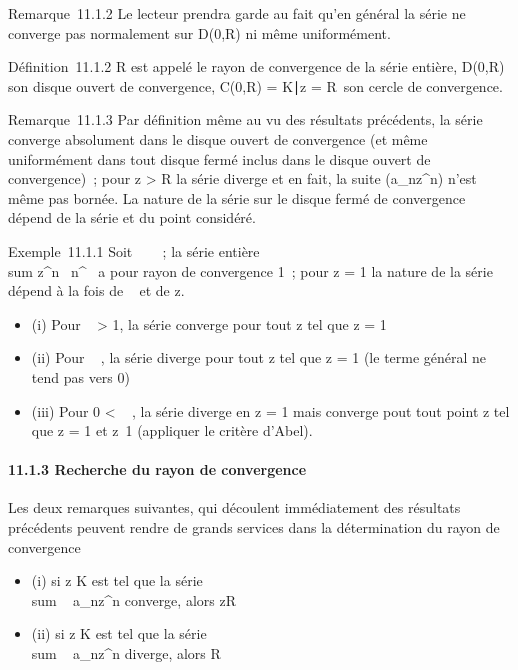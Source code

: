 \documentclass[]{article}
\begin{document}
Remarque~11.1.2 Le lecteur prendra garde au fait qu'en général la série
ne converge pas normalement sur D(0,R) ni même uniformément.

Définition~11.1.2 R est appelé le rayon de convergence de la série
entière, D(0,R) son disque ouvert de convergence, C(0,R) =
\z \in K∣z
= R\ son cercle de convergence.

Remarque~11.1.3 Par définition même au vu des résultats précédents, la
série converge absolument dans le disque ouvert de convergence (et même
uniformément dans tout disque fermé inclus dans le disque ouvert de
convergence)~; pour z \textgreater{} R la série
diverge et en fait, la suite (a_nz^n) n'est même pas
bornée. La nature de la série sur le disque fermé de convergence dépend
de la série et du point considéré.

Exemple~11.1.1 Soit \alpha~ \in {}~~; la série entière
\\sum   z^n~
\over n^\alpha~ a pour rayon de convergence 1~;
pour z = 1 la nature de la série dépend à la fois de
\alpha~ et de z.

\begin{itemize}
\itemsep1pt\parskip0pt
\item
  (i) Pour \alpha~ \textgreater{} 1, la série converge pour tout z tel que
  z = 1
\item
  (ii) Pour \alpha~ , la série diverge pour tout z tel que
  z = 1 (le terme général ne tend pas vers 0)
\item
  (iii) Pour 0 \textless{} \alpha~ , la série diverge en z = 1 mais
  converge pout tout point z tel que z = 1 et
  z\neq~1 (appliquer le critère d'Abel).
\end{itemize}

\paragraph{11.1.3 Recherche du rayon de convergence}

Les deux remarques suivantes, qui découlent immédiatement des résultats
précédents peuvent rendre de grands services dans la détermination du
rayon de convergence

\begin{itemize}
\itemsep1pt\parskip0pt
\item
  (i) si z \in K est tel que la série
  \\sum ~
  a_nz^n converge, alors z\leq R
\item
  (ii) si z \in K est tel que la série
  \\sum ~
  a_nz^n diverge, alors R \leqz
\end{itemize}
\end{document}
